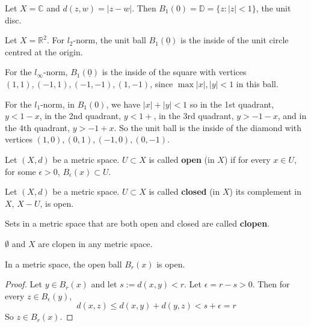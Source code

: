 \begin{example}
	Let $X = \mathbb{C}$ and $d(z, w) = |z - w|$. Then $B_1(0) = \mathbb{D} = \{ z: |z| < 1 \}$, the unit disc.
\end{example}

\begin{example}
	Let $X = \mathbb{R}^2$. For $l_2$-norm, the unit ball $B_1(\underline{0})$ is the inside of the unit circle centred at the origin.

	For the $l_{\infty}$-norm, $B_1(\underline{0})$ is the inside of the square with vertices $(1, 1), (-1, 1), (-1, -1), (1, -1)$, since $\max{ |x|, |y| } < 1$ in this ball.

	For the $l_1$-norm, in $B_1(0)$, we have $|x| + |y| < 1$ so in the 1st quadrant, $y < 1 - x$, in the 2nd quadrant, $y < 1 + $, in the 3rd quadrant, $y > -1 - x$, and in the 4th quadrant, $y > -1 + x$. So the unit ball is the inside of the diamond with vertices $(1, 0), (0, 1), (-1, 0), (0, -1)$.
\end{example}

\begin{definition}\label{def:openSet}
	Let $(X, d)$ be a metric space. $U \subset X$ is called \textbf{open} (in $X$) if for every $x \in U$, for some $\epsilon > 0$, $B_{\epsilon}(x) \subset U$.
\end{definition}

\begin{definition}\label{def:closedSet}
	Let $(X, d)$ be a metric space. $U \subset X$ is called \textbf{closed} (in $X$) its complement in $X$, $X - U$, is open.
\end{definition}

\begin{definition}
	Sets in a metric space that are both open and closed are called \textbf{clopen}.
\end{definition}

\begin{example}
	$\emptyset$ and $X$ are clopen in any metric space.
\end{example}

\begin{lemma}\label{lem:openBallsAreOpen}
	In a metric space, the open ball $B_r(x)$ is open.
\end{lemma}

\begin{proof}
	Let $y \in B_r(x)$ and let $s := d(x, y) < r$. Let $\epsilon = r - s > 0$. Then for every $z \in B_{\epsilon}(y)$,
	\[
		d(x, z) \le d(x, y) + d(y, z) < s + \epsilon = r
	\]
	So $z \in B_r(x)$.
\end{proof}

